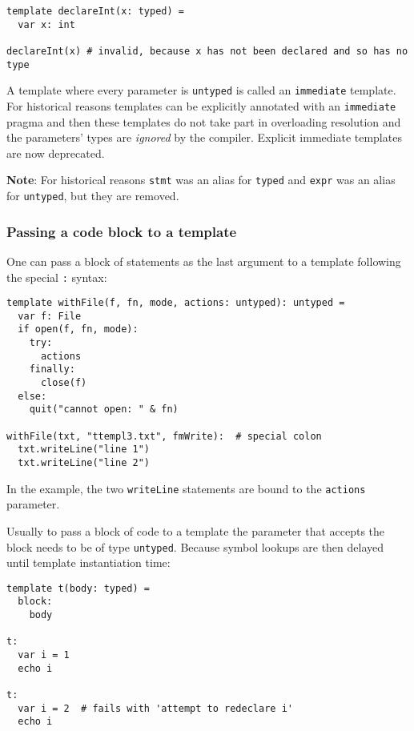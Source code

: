 \begin{verbatim}
template declareInt(x: typed) =
  var x: int

declareInt(x) # invalid, because x has not been declared and so has no type
\end{verbatim}

A template where every parameter is \texttt{untyped} is called an
\texttt{immediate} template. For historical reasons templates can be
explicitly annotated with an \texttt{immediate} pragma and then these
templates do not take part in overloading resolution and the parameters'
types are \emph{ignored} by the compiler. Explicit immediate templates
are now deprecated.

\textbf{Note}: For historical reasons \texttt{stmt} was an alias for
\texttt{typed} and \texttt{expr} was an alias for \texttt{untyped}, but
they are removed.

\hypertarget{passing-a-code-block-to-a-template}{%
\subsubsection{Passing a code block to a
template}\label{passing-a-code-block-to-a-template}}

One can pass a block of statements as the last argument to a template
following the special \texttt{:} syntax:

\begin{verbatim}
template withFile(f, fn, mode, actions: untyped): untyped =
  var f: File
  if open(f, fn, mode):
    try:
      actions
    finally:
      close(f)
  else:
    quit("cannot open: " & fn)

withFile(txt, "ttempl3.txt", fmWrite):  # special colon
  txt.writeLine("line 1")
  txt.writeLine("line 2")
\end{verbatim}

In the example, the two \texttt{writeLine} statements are bound to the
\texttt{actions} parameter.

Usually to pass a block of code to a template the parameter that accepts
the block needs to be of type \texttt{untyped}. Because symbol lookups
are then delayed until template instantiation time:

\begin{verbatim}
template t(body: typed) =
  block:
    body

t:
  var i = 1
  echo i

t:
  var i = 2  # fails with 'attempt to redeclare i'
  echo i
\end{verbatim}

